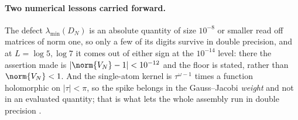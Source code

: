 \paragraph{Two numerical lessons carried forward.} The defect
$\lambda_{\min}(D_N)$ is an absolute quantity of size $10^{-8}$ or smaller read
off matrices of norm one, so only a few of its digits survive in double
precision, and at $L=\log5,\log7$ it comes out of either sign at the $10^{-14}$
level: there the assertion made is $\lvert\norm{V_N}-1\rvert<10^{-12}$ and the
floor is stated, rather than $\norm{V_N}<1$. And the single-atom kernel is
$\tau^{\omega-1}$ times a function holomorphic on $\lvert\tau\rvert<\pi$, so the
spike belongs in the Gauss--Jacobi \emph{weight} and not in an evaluated
quantity; that is what lets the whole assembly run in double precision
\cite[Sec.~5.1]{Markov}.
